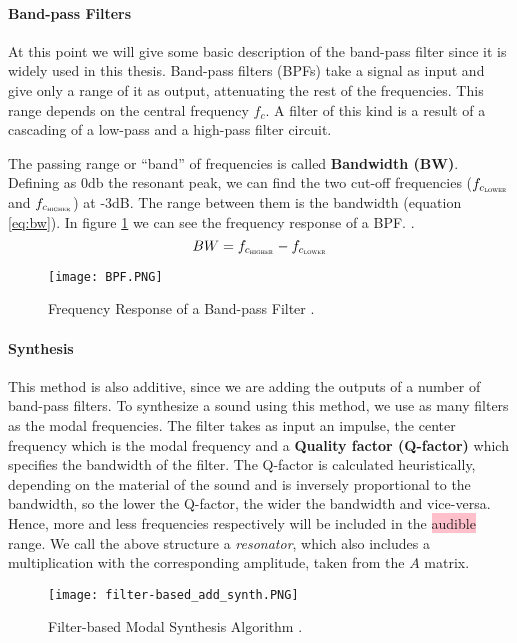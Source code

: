 \paragraph{Band-pass Filters\\}\label{par:bpf}

At this point we will give some basic description of the band-pass filter since it is widely used in this thesis. Band-pass filters (BPFs) take a signal as input and give only a range of it as output, attenuating the rest of the frequencies. This range depends on the central frequency $f_c$. A filter of this kind is a result of a cascading of a low-pass and a high-pass filter circuit.

The passing range or ``band'' of frequencies is called \textbf{Bandwidth (BW)}. Defining as 0db the resonant peak, we can find the two cut-off frequencies ($f_{c{_\textsc{lower}}}$ and $f_{c_{\textsc{higher}}}$) at -3dB. The range between them is the bandwidth (equation \ref{eq:bw}). In figure \ref{fig:resp_bpf} we can see the frequency response of a BPF. \cite{bib:bpf}. 
\begin{equation}\label{eq:bw}
BW = f_{c_{\textsc{higher}}}-f_{c_{\textsc{lower}}}
\end{equation}   

\begin{figure}[H]
  \centering
    \texttt{[image: BPF.PNG]}
      \caption{Frequency Response of a Band-pass Filter  \cite{bib:bpf}.}
      \label{fig:resp_bpf}
\end{figure}

\paragraph{Synthesis\\}\label{par:synth}

This method is also additive, since we are adding the outputs of a number of band-pass filters. To synthesize a sound using this method, we use as many filters as the modal frequencies. The filter takes as input an impulse, the center frequency which is the modal frequency and a \textbf{Quality factor (Q-factor)} which specifies the bandwidth of the filter. The Q-factor is calculated heuristically, depending on the material of the sound and is inversely proportional to the bandwidth, so the lower the Q-factor, the wider the bandwidth and vice-versa. Hence, more and less frequencies respectively will be included in the \colorbox{pink}{audible} range. We call the above structure a \textit{resonator}, which also includes a multiplication with the corresponding amplitude, taken from the $A$ matrix.

\begin{figure}[H]
  \centering
    \texttt{[image: filter-based\_add\_synth.PNG]}
      \caption{Filter-based Modal Synthesis Algorithm \cite{Cook:2002:RSS:515316}.}
      \label{fig:filter_synth}
\end{figure}

